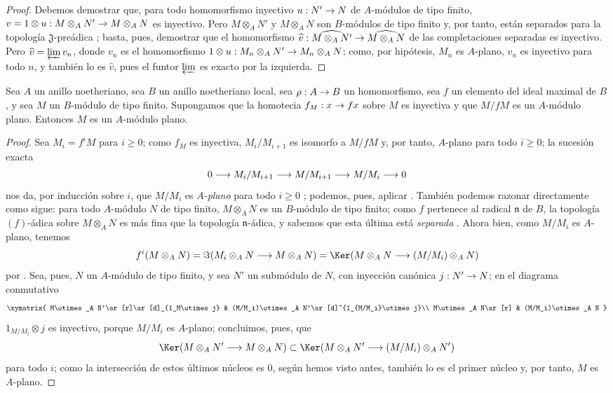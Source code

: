 \documentclass[oneside]{amsart}
\makeatletter
\renewcommand{\geq}{\geqslant}
\newcommand{\ega@arrow}[2]{\mathchoice{#1}{#2}{#2}{#2}}
\renewcommand{\to}{\ega@arrow{\longrightarrow}{\rightarrow}}
\newcommand{\oldpage}[2][]{{\marginnote{\normalfont\textbf{#1}~|~#2}}\ignorespaces}
\let\EGAOriginalLabel\label
\renewcommand{\label}[1]{\phantomsection\EGAOriginalLabel{#1}}
\makeatother
\begin{document}
\begin{proof}
Debemos demostrar que, para todo homomorfismo inyectivo $u:N'\to N$ de $A$-módulos de tipo finito, $v=1\otimes u:M\otimes_A N'\to M\otimes_A N$ es inyectivo.
Pero $M\otimes_A N'$ y $M\otimes_A N$ son $B$-módulos de tipo finito y, por tanto, están separados para la topología $\mathfrak{J}$-preádica ;
basta, pues, demostrar que el homomorfismo $\widehat{v}:\widehat{M\otimes_A N'}\to\widehat{M\otimes_A N}$ de las completaciones separadas es inyectivo.
Pero $\widehat{v}=\varprojlim v_n$, donde $v_n$ es el homomorfismo $1\otimes u:M_n\otimes_A N'\to M_n\otimes_A N$;
como, por hipótesis, $M_n$ es $A$-plano, $v_n$ es inyectivo para todo $n$, y también lo es $\widehat{v}$, pues el funtor $\varprojlim$ es exacto por la izquierda.
\end{proof}

\begin{corollary}[10.2.7]
\label{0.10.2.7}
Sea $A$ un anillo noetheriano, sea $B$ un anillo noetheriano local, sea $\rho:A\to B$ un homomorfismo, sea $f$ un elemento del ideal maximal de $B$, y sea $M$ un $B$-módulo de tipo finito.
Supongamos que la homotecia $f_M:x\to fx$ sobre $M$ es inyectiva y que $M/fM$ es un $A$-módulo plano.
Entonces $M$ es un $A$-módulo plano.
\end{corollary}

\begin{proof}
Sea $M_i=f^iM$ para $i\geq0$;
como $f_M$ es inyectiva, $M_i/M_{i+1}$ es isomorfo a $M/fM$ y, por tanto, $A$-plano para todo $i\geq0$;
la sucesión exacta
\[
  0\to M_i/M_{i+1}\to M/M_{i+1}\to M/M_i\to 0
\]
nos da, por inducción sobre $i$, que $M/M_i$ es \emph{$A$-plano} para todo $i\geq0$ ;
podemos, pues, aplicar .
También podemos razonar directamente como sigue:
para todo $A$-módulo $N$ de tipo finito, $M\otimes_A N$ es un $B$-módulo de tipo finito;
como $f$ pertenece al radical $\mathfrak{n}$ de $B$, la topología $(f)$-ádica sobre $M\otimes_A N$ es más fina que la topología
\oldpage[0\textsubscript{III-1}]{20}
$\mathfrak{n}$-ádica, y sabemos que esta última está \emph{separada} .
Ahora bien, como $M/M_i$ es $A$-plano, tenemos
\[
  f^i(M\otimes_A N)=\Im(M_i\otimes_A N\to M\otimes_A N)=\Ker(M\otimes_A N\to(M/M_i)\otimes_A N)
\]
por .
Sea, pues, $N$ un $A$-módulo de tipo finito, y sea $N'$ un submódulo de $N$, con inyección canónica $j:N'\to N$; en el diagrama conmutativo
\[
  \xymatrix{
    M\otimes_A N'\ar[r]\ar[d]_{1_M\otimes j} &
    (M/M_i)\otimes_A N'\ar[d]^{1_{M/M_i}\otimes j}\\
    M\otimes_A N\ar[r] &
    (M/M_i)\otimes_A N
  }
\]
$1_{M/M_i}\otimes j$ es inyectivo, porque $M/M_i$ es $A$-plano; concluimos, pues, que
\[
  \Ker(M\otimes_A N'\to M\otimes_A N)\subset\Ker(M\otimes_A N'\to(M/M_i)\otimes_A N')
\]
para todo $i$; como la intersección de estos últimos núcleos es $0$, según hemos visto antes, también lo es el primer núcleo y, por tanto, $M$ es $A$-plano.
\end{proof}
\end{document}
